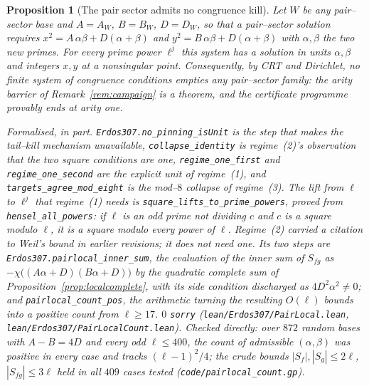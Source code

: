 \documentclass[11pt]{article}
\newtheorem{proposition}[theorem]{Proposition}
\theoremstyle{definition}
\begin{document}
\begin{proposition}[The pair sector admits no congruence kill]\label{prop:pairlocal}
Let $W$ be any pair--sector base and $A=A_W$, $B=B_W$, $D=D_W$, so that a pair--sector solution
requires $x^2=A\,\alpha\beta+D(\alpha+\beta)$ and $y^2=B\,\alpha\beta+D(\alpha+\beta)$ with
$\alpha,\beta$ the two new primes. For every prime power $\ell^j$ this system has a solution in
units $\alpha,\beta$ and integers $x,y$ at a nonsingular point. Consequently, by CRT and Dirichlet,
no finite system of congruence conditions empties any pair--sector family: the arity barrier of
Remark~\ref{rem:campaign} is a theorem, and the certificate programme provably ends at arity one.

\textup{Formalised, in part.} \texttt{Erdos307.no\_pinning\_isUnit} is the step that makes the
tail--kill mechanism unavailable, \texttt{collapse\_identity} is regime~\textup{(2)}'s
observation that the two square conditions are one, \texttt{regime\_one\_first} and
\texttt{regime\_one\_second} are the explicit unit of regime~\textup{(1)}, and
\texttt{targets\_agree\_mod\_eight} is the mod--$8$ collapse of regime~\textup{(3)}. The lift from
$\ell$ to $\ell^j$ that regime~\textup{(1)} needs is \texttt{square\_lifts\_to\_prime\_powers},
proved from \texttt{hensel\_all\_powers}: if $\ell$ is an odd prime not dividing $c$ and $c$ is a
square modulo $\ell$, it is a square modulo every power of $\ell$. Regime~\textup{(2)} carried a citation to Weil's
bound in earlier revisions; it does not need one. Its two steps are
\texttt{Erdos307.pairlocal\_inner\_sum}, the evaluation of the inner sum of $S_{fg}$ as
$-\chi\bigl((A\alpha+D)(B\alpha+D)\bigr)$ by the quadratic complete sum of
Proposition~\ref{prop:localcomplete}, with its side condition discharged as $4D^2\alpha^2\ne0$; and
\texttt{pairlocal\_count\_pos}, the arithmetic turning the resulting $O(\ell)$ bounds into a positive
count from $\ell\ge17$. $0$ \texttt{sorry} \textup{(\texttt{lean/Erdos307/PairLocal.lean},
\texttt{lean/Erdos307/PairLocalCount.lean})}. Checked directly: over $872$ random bases with
$A-B=4D$ and every odd $\ell\le400$, the count of admissible $(\alpha,\beta)$ was positive in every
case and tracks $(\ell-1)^2/4$; the crude bounds $|S_f|,|S_g|\le2\ell$, $|S_{fg}|\le3\ell$ held in
all $409$ cases tested \textup{(\texttt{code/pairlocal\_count.gp})}.
\end{proposition}
\end{document}
